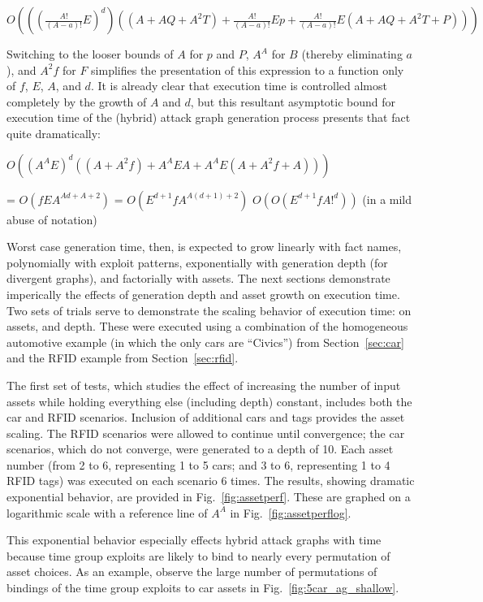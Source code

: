 $O(((\frac{A!}{(A-a)!}E)^d)((A+AQ + A^2T) + \frac{A!}{(A-a)!}Ep + \frac{A!}{(A-a)!}E(A+AQ + A^2T+P)))$

Switching to the looser bounds of $A$ for $p$ and $P$, $A^A$ for $B$ 
(thereby eliminating $a$), and $A^2f$ for $F$
simplifies the presentation of this expression to a function only of $f$,
$E$, $A$, and $d$. It is already clear that execution time is controlled almost
completely by the growth of $A$ and $d$, but this resultant asymptotic bound for
execution time of the (hybrid) attack graph generation process presents that 
fact quite dramatically:

$O((A^AE)^d((A+A^2f) + A^AEA + A^AE(A+A^2f+A)))$

= $O(fEA^{Ad+A+2})$
= $O(E^{d+1}fA^{A(d+1)+2})$
\approx $O(O(E^{d+1}fA!^{d}))$ (in a mild abuse of notation)

Worst case generation time, then, is expected to grow linearly with fact names, 
polynomially with exploit patterns, exponentially with generation depth (for divergent 
graphs), and factorially with assets. The next sections demonstrate imperically
the effects of generation depth and asset growth on execution time.
Two sets of trials serve to demonstrate the scaling behavior of execution time:
on assets, and depth. These were executed using a combination of the 
homogeneous automotive example (in which the only cars are ``Civics'') from
Section~\ref{sec:car} and the RFID example from Section~\ref{sec:rfid}.

The first set of tests, which studies the effect of increasing the number of 
input assets while holding everything else (including depth) constant,
includes both the car and RFID scenarios. Inclusion of additional cars and
tags provides the asset scaling. The RFID scenarios were allowed to continue
until convergence; the car scenarios, which do not converge, were generated
to a depth of 10. Each asset number (from 2 to 6, representing 1 to 5 cars; and
3 to 6, representing 1 to 4 RFID tags) was executed on each scenario 6 times.
The results, showing dramatic exponential behavior, are provided in 
Fig.~\ref{fig:assetperf}. These are graphed on a logarithmic scale with a
reference line of $A^A$ in Fig.~\ref{fig:assetperflog}.

This exponential behavior especially effects hybrid attack graphs with time 
because time group exploits are likely to bind to nearly every permutation of 
asset choices. As an example, observe the large number of permutations of 
bindings of the time group exploits to car assets in 
Fig.~\ref{fig:5car_ag_shallow}.

